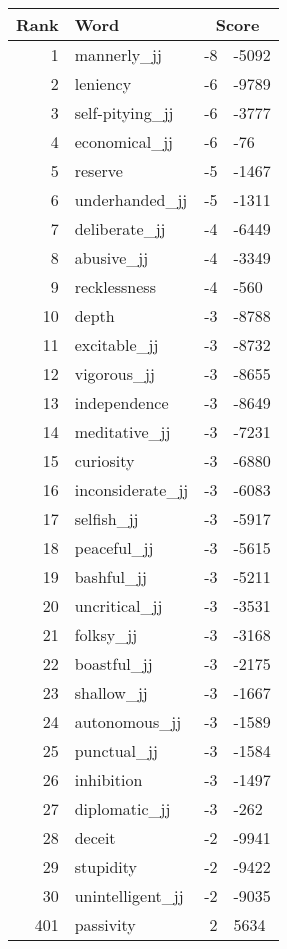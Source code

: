 \begin{longtable}[!htbp]{| rlr@{.}l |}
    \hline
    \textbf{Rank} & \textbf{Word} & \multicolumn{2}{c|}{\textbf{Score}} \\
    \hline
    \endhead
    1 & mannerly\_jj & -8 & -5092 \\
    2 & leniency & -6 & -9789 \\
    3 & self-pitying\_jj & -6 & -3777 \\
    4 & economical\_jj & -6 & -76 \\
    5 & reserve & -5 & -1467 \\
    6 & underhanded\_jj & -5 & -1311 \\
    7 & deliberate\_jj & -4 & -6449 \\
    8 & abusive\_jj & -4 & -3349 \\
    9 & recklessness & -4 & -560 \\
    10 & depth & -3 & -8788 \\
    11 & excitable\_jj & -3 & -8732 \\
    12 & vigorous\_jj & -3 & -8655 \\
    13 & independence & -3 & -8649 \\
    14 & meditative\_jj & -3 & -7231 \\
    15 & curiosity & -3 & -6880 \\
    16 & inconsiderate\_jj & -3 & -6083 \\
    17 & selfish\_jj & -3 & -5917 \\
    18 & peaceful\_jj & -3 & -5615 \\
    19 & bashful\_jj & -3 & -5211 \\
    20 & uncritical\_jj & -3 & -3531 \\
    21 & folksy\_jj & -3 & -3168 \\
    22 & boastful\_jj & -3 & -2175 \\
    23 & shallow\_jj & -3 & -1667 \\
    24 & autonomous\_jj & -3 & -1589 \\
    25 & punctual\_jj & -3 & -1584 \\
    26 & inhibition & -3 & -1497 \\
    27 & diplomatic\_jj & -3 & -262 \\
    28 & deceit & -2 & -9941 \\
    29 & stupidity & -2 & -9422 \\
    30 & unintelligent\_jj & -2 & -9035 \\
    401 & passivity & 2 & 5634 \\

\end{longtable}
